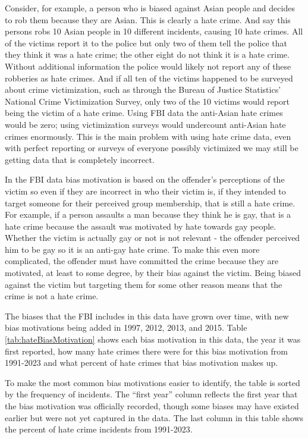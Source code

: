 \documentclass[
]{krantz}
\begin{document}
Consider, for example, a person who is biased against Asian
people and decides to rob them because they are Asian. This
is clearly a hate crime. And say this persons robs 10 Asian
people in 10 different incidents, causing 10 hate crimes.
All of the victims report it to the police but only two of
them tell the police that they think it was a hate crime;
the other eight do not think it is a hate crime. Without
additional information the police would likely not report
any of these robberies as hate crimes. And if all ten of the
victims happened to be surveyed about crime victimization,
such as through the Bureau of Justice Statistics' National
Crime Victimization Survey, only two of the 10 victims would
report being the victim of a hate crime. Using FBI data the
anti-Asian hate crimes would be zero; using victimization
surveys would undercount anti-Asian hate crimes enormously.
This is the main problem with using hate crime data, even
with perfect reporting or surveys of everyone possibly
victimized we may still be getting data that is completely
incorrect.

In the FBI data bias motivation is based on the offender's
perceptions of the victim so even if they are incorrect in
who their victim is, if they intended to target someone for
their perceived group membership, that is still a hate
crime. For example, if a person assaults a man because they
think he is gay, that is a hate crime because the assault
was motivated by hate towards gay people. Whether the victim
is actually gay or not is not relevant - the offender
perceived him to be gay so it is an anti-gay hate crime. To
make this even more complicated, the offender must have
committed the crime because they are motivated, at least to
some degree, by their bias against the victim. Being biased
against the victim but targeting them for some other reason
means that the crime is not a hate crime.

The biases that the FBI includes in this data have grown
over time, with new bias motivations being added in 1997,
2012, 2013, and 2015. Table \ref{tab:hateBiasMotivation}
shows each bias motivation in this data, the year it was
first reported, how many hate crimes there were for this
bias motivation from 1991-2023 and what percent of hate
crimes that bias motivation makes up.

To make the most common bias motivations easier to identify,
the table is sorted by the frequency of incidents. The
``first year'' column reflects the first year that the bias
motivation was officially recorded, though some biases may
have existed earlier but were not yet captured in the data.
The last column in this table shows the percent of hate
crime incidents from 1991-2023.
\end{document}
